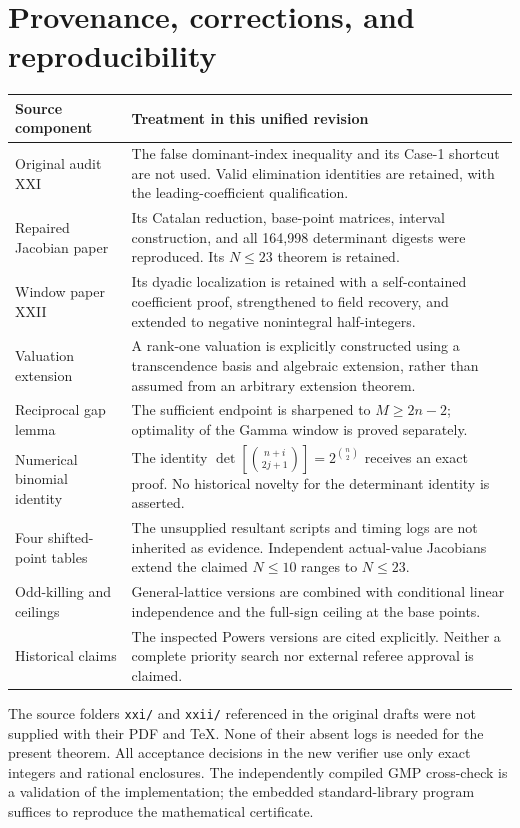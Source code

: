 \documentclass[11pt,a4paper]{article}
\theoremstyle{definition}\newtheorem{definition}[theorem]{Definition}
\theoremstyle{remark}\newtheorem{remark}[theorem]{Remark}
\begin{document}
\section{Provenance, corrections, and reproducibility}\label{sec:revision}
\begin{longtable}{p{}p{}}
\toprule Source component & Treatment in this unified revision\\\midrule\endhead
Original audit XXI & The false dominant-index inequality and its Case-1 shortcut are not used. Valid elimination identities are retained, with the leading-coefficient qualification.\\
Repaired Jacobian paper & Its Catalan reduction, base-point matrices, interval construction, and all 164,998 determinant digests were reproduced. Its $N\le23$ theorem is retained.\\
Window paper XXII & Its dyadic localization is retained with a self-contained coefficient proof, strengthened to field recovery, and extended to negative nonintegral half-integers.\\
Valuation extension & A rank-one valuation is explicitly constructed using a transcendence basis and algebraic extension, rather than assumed from an arbitrary extension theorem.\\
Reciprocal gap lemma & The sufficient endpoint is sharpened to $M\ge2n-2$; optimality of the Gamma window is proved separately.\\
Numerical binomial identity & The identity $\det[\binom{n+i}{2j+1}]=2^{\binom n2}$ receives an exact proof. No historical novelty for the determinant identity is asserted.\\
Four shifted-point tables & The unsupplied resultant scripts and timing logs are not inherited as evidence. Independent actual-value Jacobians extend the claimed $N\le10$ ranges to $N\le23$.\\
Odd-killing and ceilings & General-lattice versions are combined with conditional linear independence and the full-sign ceiling at the base points.\\
Historical claims & The inspected Powers versions are cited explicitly. Neither a complete priority search nor external referee approval is claimed.\\\bottomrule
\end{longtable}

The source folders \texttt{xxi/} and \texttt{xxii/} referenced in the original drafts were not supplied with their PDF and TeX. None of their absent logs is needed for the present theorem. All acceptance decisions in the new verifier use only exact integers and rational enclosures. The independently compiled GMP cross-check is a validation of the implementation; the embedded standard-library program suffices to reproduce the mathematical certificate.
\end{document}
